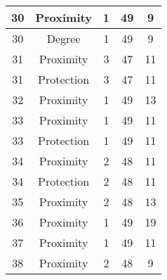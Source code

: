 \documentclass[results.tex]{subfiles}
\begin{document}
\begin{center}
\begin{tabular}{| c || c | c | c | c |}
            \hline
            30                      & Proximity                    & 1                      & 49                      & 9                    \\
            \hline
            30                      & Degree                       & 1                      & 49                      & 9                    \\
            \hline
            31                      & Proximity                    & 3                      & 47                      & 11                   \\
            \hline
            31                      & Protection                   & 3                      & 47                      & 11                   \\
            \hline
            32                      & Proximity                    & 1                      & 49                      & 13                   \\
            \hline
            33                      & Proximity                    & 1                      & 49                      & 11                   \\
            \hline
            33                      & Protection                   & 1                      & 49                      & 11                   \\
            \hline
            34                      & Proximity                    & 2                      & 48                      & 11                   \\
            \hline
            34                      & Protection                   & 2                      & 48                      & 11                   \\
            \hline
            35                      & Proximity                    & 2                      & 48                      & 13                   \\
            \hline
            36                      & Proximity                    & 1                      & 49                      & 19                   \\
            \hline
            37                      & Proximity                    & 1                      & 49                      & 11                   \\
            \hline
            38                      & Proximity                    & 2                      & 48                      & 9                    \\

\end{tabular}
\end{center}
\end{document}
